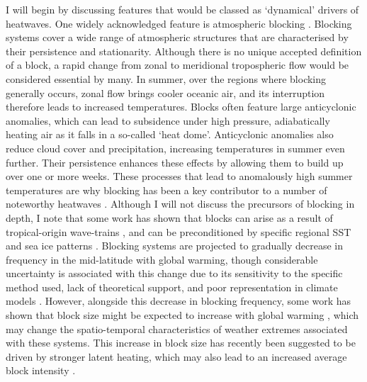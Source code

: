   I will begin by discussing features that would be classed as `dynamical' drivers of heatwaves. One widely acknowledged feature is atmospheric blocking \citep{garriott_long-range_1904,kautz_atmospheric_2022}. Blocking systems cover a wide range of atmospheric structures that are characterised by their persistence and stationarity. Although there is no unique accepted definition of a block, a rapid change from zonal to meridional tropospheric flow would be considered essential by many. In summer, over the regions where blocking generally occurs, zonal flow brings cooler oceanic air, and its interruption therefore leads to increased temperatures. Blocks often feature large anticyclonic anomalies, which can lead to subsidence under high pressure, adiabatically heating air as it falls in a so-called `heat dome'. Anticyclonic anomalies also reduce cloud cover and precipitation, increasing temperatures in summer even further. Their persistence enhances these effects by allowing them to build up over one or more weeks. These processes that lead to anomalously high summer temperatures are why blocking has been a key contributor to a number of noteworthy heatwaves \citep{woollings_blocking_2018}. Although I will not discuss the precursors of blocking in depth, I note that some work has shown that blocks can arise as a result of tropical-origin wave-trains \citep{schneidereit_large-scale_2012,greatbatch_tropical_2015}, and can be preconditioned by specific regional SST and sea ice patterns \citep{di_capua_drivers_2021,wang_summer_2020}. Blocking systems are projected to gradually decrease in frequency in the mid-latitude with global warming, though considerable uncertainty is associated with this change due to its sensitivity to the specific method used, lack of theoretical support, and poor representation in climate models \citep{woollings_blocking_2018}. However, alongside this decrease in blocking frequency, some work has shown that block size might be expected to increase with global warming \citep{nabizadeh_size_2019}, which may change the spatio-temporal characteristics of weather extremes associated with these systems. This increase in block size has recently been suggested to be driven by stronger latent heating, which may also lead to an increased average block intensity \citep{steinfeld_response_2022}.

